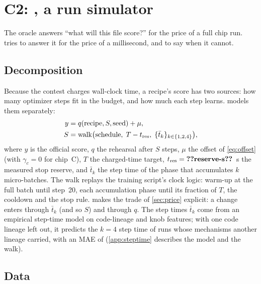 \section{C2: \texorpdfstring{\ffsim}{ffsim}, a run simulator}
\label{sec:sim}

The oracle answers ``what will this file score?'' for the price of a full chip run. \ffsim{} tries to answer it for
the price of a millisecond, and to say when it cannot.

\subsection{Decomposition}
\label{sec:decomp}

Because the contest charges wall-clock time, a recipe's score has two sources: how many optimizer steps fit in the
budget, and how much each step learns. \ffsim{} models them separately:
\begin{align}
  y &= q(\text{recipe}, S, \text{seed}) + \mu, \label{eq:decomp}\\
  S &= \operatorname{walk}\bigl(\text{schedule},\; T - t_{\text{res}},\; \{\bar t_k\}_{k\in\{1,2,4\}}\bigr), \notag
\end{align}
where $y$ is the official score, $q$ the rehearsal \valbpb{} after $S$ steps, $\mu$ the offset of \cref{eq:offset}
(with $\gamma_c=0$ for chip~C), $T$ the charged-time target, $t_{\text{res}}=\val{reserve-s}$\docnum{}~s the
measured stop reserve, and $\bar t_k$ the step time of the phase that accumulates $k$ micro-batches. The walk
replays the training script's clock logic: warm-up at the full batch until step~20, each accumulation phase until
its fraction of $T$, the cooldown and the stop rule.  makes the trade of \cref{sec:price} explicit:
a change enters through $\bar t_k$ (and so $S$) and through $q$. The step times $\bar t_k$ come from an empirical
step-time model on code-lineage and knob features; with one code lineage left out, it predicts the $k\!=\!4$ step time
of runs whose mechanisms another lineage carried, with an MAE of  (\cref{app:steptime} describes
the model and the walk).

\subsection{Data}
\label{sec:simdata}

